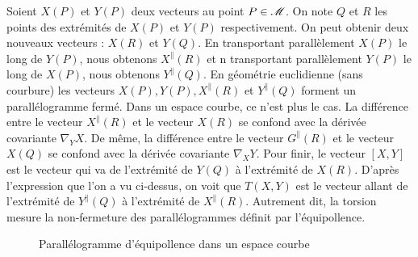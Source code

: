 \documentclass[a4paper,11pt]{report}
\begin{document}
                Soient $X(P)$ et $Y(P)$ deux vecteurs au point $P\in \mathscr{M}$. On note $Q$ et $R$ les points des extrémités de $X(P)$ et $Y(P)$ respectivement. On peut obtenir deux nouveaux vecteurs : $X(R)$ et $Y(Q)$. En transportant parallèlement $X(P)$ le long de $Y(P)$, nous obtenons $X^\parallel(R)$ et n transportant parallèlement $Y(P)$ le long de $X(P)$, nous obtenons $Y^\parallel(Q)$. En géométrie euclidienne (sans courbure) les vecteurs $X(P),Y(P),X^\parallel(R)$ et $Y^\parallel(Q)$ forment un parallélogramme fermé. Dans un espace courbe, ce n'est plus le cas. La différence entre le vecteur $X^\parallel(R)$ et le vecteur $X(R)$ se confond avec la dérivée covariante $\nabla_Y X$. De même, la différence entre le vecteur $G^\parallel(R)$ et le vecteur $X(Q)$ se confond avec la dérivée covariante $\nabla_X Y$. Pour finir, le vecteur $[X,Y]$ est le vecteur qui va de l'extrémité de $Y(Q)$ à l'extrémité de $X(R)$. D'après l'expression que l'on a vu ci-dessus, on voit que $T(X,Y)$ est le vecteur allant de l'extrémité de $Y^\parallel(Q)$ à l'extrémité de $X^\parallel(R)$. Autrement dit, la torsion mesure la non-fermeture des parallélogrammes définit par l'équipollence.
                
                \begin{figure}[H]
                    \centering
                    \caption{Parallélogramme d'équipollence dans un espace courbe}
                    \label{fig:my_label}
                \end{figure}
                
\end{document}
